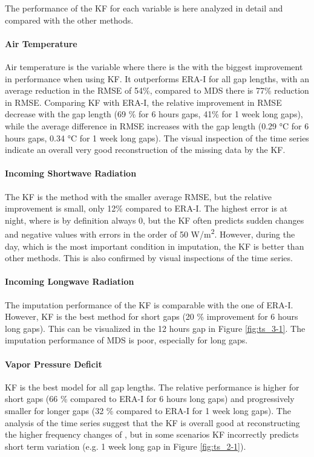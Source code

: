 \documentclass{article}
\begin{document}
The performance of the KF for each variable is here analyzed in detail and compared with the other methods.

\paragraph{Air Temperature} Air temperature is the variable where there is the with the biggest improvement in performance when using KF. It outperforms ERA-I for all gap lengths, with an average reduction in the RMSE of 54\%, compared to MDS there is 77\% reduction in RMSE. Comparing KF with ERA-I, the relative improvement in RMSE decrease with the gap length (69 \% for 6 hours gaps, 41\% for 1 week long gaps), while the average difference in RMSE increases with the gap length (0.29 °C  for 6 hours gaps, 0.34 °C for 1 week long gaps).
The visual inspection of the time series indicate an overall very good reconstruction of the missing data by the KF.

\paragraph{Incoming Shortwave Radiation} The KF is the method with the smaller average RMSE, but the relative improvement is small, only 12\% compared to ERA-I. The highest error is at night, where  is by definition always 0, but the KF often predicts sudden changes and negative values with errors in the order of 50 \si{W/m^2}. However, during the day, which is the most important condition in  imputation, the KF is better than other methods. This is also confirmed by visual inspections of the time series.

\paragraph{Incoming Longwave Radiation} The imputation performance of the KF is comparable with the one of ERA-I. However, KF is the best method for short gaps (20 \% improvement for 6 hours long gaps). This can be visualized in the 12 hours gap in Figure \ref{fig:ts_3-1}. The imputation performance of MDS is poor, especially for long gaps.

\paragraph{Vapor Pressure Deficit} KF is the best model for all gap lengths. The relative performance is higher for short gaps (66 \% compared to ERA-I for 6 hours long gaps) and progressively smaller for longer gaps (32 \% compared to ERA-I for 1 week long gaps). The analysis of the time series suggest that the KF is overall good at reconstructing the higher frequency changes of , but in some scenarios KF incorrectly predicts short term variation (e.g. 1 week long gap in Figure \ref{fig:ts_2-1}).
\end{document}
